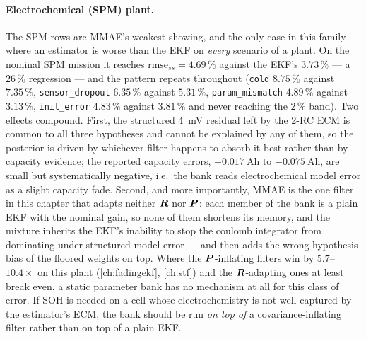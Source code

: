 \paragraph{Electrochemical (SPM) plant.}  The SPM rows are MMAE's weakest showing, and the only case
in this family where an estimator is worse than the EKF on \emph{every} scenario of a plant.  On the
nominal SPM mission it reaches $\mathrm{rmse}_{ss}=4.69\,\%$ against the EKF's $3.73\,\%$ --- a
$26\,\%$ regression --- and the pattern repeats throughout (\texttt{cold} $8.75\,\%$ against
$7.35\,\%$, \texttt{sensor\_dropout} $6.35\,\%$ against $5.31\,\%$, \texttt{param\_mismatch}
$4.89\,\%$ against $3.13\,\%$, \texttt{init\_error} $4.83\,\%$ against $3.81\,\%$ and never reaching
the $2\,\%$ band).  Two effects compound.  First, the structured \SI{4}{\milli\volt} residual left by
the 2-RC ECM is common to all three hypotheses and cannot be explained by any of them, so the
posterior is driven by whichever filter happens to absorb it best rather than by capacity evidence;
the reported capacity errors, $\SI{-0.017}{\ampere\hour}$ to $\SI{-0.075}{\ampere\hour}$, are small
but systematically negative, i.e.\ the bank reads electrochemical model error as a slight capacity
fade.  Second, and more importantly, MMAE is the one filter in this chapter that adapts neither $\bm{R}$
nor $\bm{P}$: each member of the bank is a plain EKF with the nominal gain, so none of them shortens its
memory, and the mixture inherits the EKF's inability to stop the coulomb integrator from dominating
under structured model error --- and then adds the wrong-hypothesis bias of the floored weights on
top.  Where the $\bm{P}$-inflating filters win by $5.7$--$10.4\times$ on this plant
(\cref{ch:fadingekf}, \cref{ch:stf}) and the $\bm{R}$-adapting ones at least break even, a static
parameter bank has no mechanism at all for this class of error.  If SOH is needed on a cell whose
electrochemistry is not well captured by the estimator's ECM, the bank should be run \emph{on top of}
a covariance-inflating filter rather than on top of a plain EKF.

